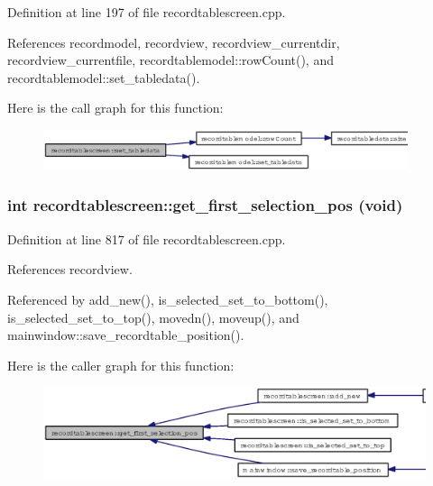 Definition at line 197 of file recordtablescreen.cpp.

References recordmodel, recordview, recordview\_\-currentdir, recordview\_\-currentfile, recordtablemodel::row\-Count(), and recordtablemodel::set\_\-tabledata().

Here is the call graph for this function:\begin{figure}[H]
\begin{center}
\leavevmode
\includegraphics[width=303pt]{classrecordtablescreen_e1572a908c5e8c72af3ed0000375e2dd_cgraph}
\end{center}
\end{figure}
\subsubsection{\setlength{\rightskip}{0pt plus 5cm}int recordtablescreen::get\_\-first\_\-selection\_\-pos (void)}\label{classrecordtablescreen_edf8ac561d0f33acf6af0fe63fbc8a91}




Definition at line 817 of file recordtablescreen.cpp.

References recordview.

Referenced by add\_\-new(), is\_\-selected\_\-set\_\-to\_\-bottom(), is\_\-selected\_\-set\_\-to\_\-top(), movedn(), moveup(), and mainwindow::save\_\-recordtable\_\-position().

Here is the caller graph for this function:\begin{figure}[H]
\begin{center}
\leavevmode
\includegraphics[width=396pt]{classrecordtablescreen_edf8ac561d0f33acf6af0fe63fbc8a91_icgraph}
\end{center}
\end{figure}
